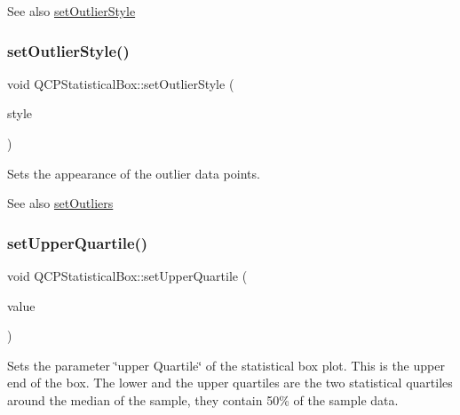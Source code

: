 \begin{DoxySeeAlso}{See also}
\hyperlink{class_q_c_p_statistical_box_ad5241943422eb8e58360a97e99ad6aa7}{set\+Outlier\+Style} 
\end{DoxySeeAlso}
\hypertarget{class_q_c_p_statistical_box_ad5241943422eb8e58360a97e99ad6aa7}{}\label{class_q_c_p_statistical_box_ad5241943422eb8e58360a97e99ad6aa7} 
\subsubsection{\texorpdfstring{set\+Outlier\+Style()}{setOutlierStyle()}}
{\footnotesize\ttfamily void Q\+C\+P\+Statistical\+Box\+::set\+Outlier\+Style (\begin{DoxyParamCaption}\item[{const \hyperlink{class_q_c_p_scatter_style}{Q\+C\+P\+Scatter\+Style} \&}]{style }\end{DoxyParamCaption})}

Sets the appearance of the outlier data points.

\begin{DoxySeeAlso}{See also}
\hyperlink{class_q_c_p_statistical_box_af9bc09620e0bf93bf444ee35e5800d1d}{set\+Outliers} 
\end{DoxySeeAlso}
\hypertarget{class_q_c_p_statistical_box_a65a1375f941c5a2077b5201229e89346}{}\label{class_q_c_p_statistical_box_a65a1375f941c5a2077b5201229e89346} 
\subsubsection{\texorpdfstring{set\+Upper\+Quartile()}{setUpperQuartile()}}
{\footnotesize\ttfamily void Q\+C\+P\+Statistical\+Box\+::set\+Upper\+Quartile (\begin{DoxyParamCaption}\item[{double}]{value }\end{DoxyParamCaption})}

Sets the parameter \char`\"{}upper Quartile\char`\"{} of the statistical box plot. This is the upper end of the box. The lower and the upper quartiles are the two statistical quartiles around the median of the sample, they contain 50\% of the sample data.

